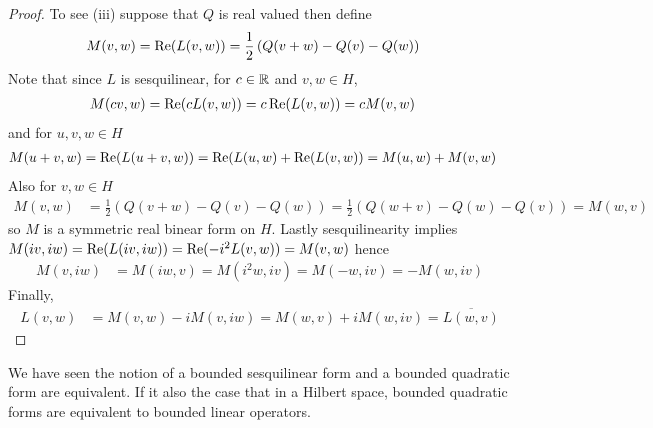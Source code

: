 \begin{proof}
To see (iii) suppose that $Q$ is real valued then define
\begin{align*}
M(v,w) &= \operatorname*{Re} (L(v,w))  = \frac{1}{2} \left( Q(v+w) - Q(v) - Q(w) \right)
\end{align*}
Note that since $L$ is sesquilinear, for $c \in \mathbb{R}$ and $v,w \in H$,
\begin{align*}
M(cv, w) &= \operatorname*{Re} (c L(v,w)) =c \operatorname*{Re} ( L(v,w)) = cM(v,w)
\end{align*}
and for $u,v,w \in H$
\begin{align*}
M(u+v, w) &= \operatorname*{Re} (L(u+v,w)) =\operatorname*{Re} ( L(u,w) + \operatorname*{Re} ( L(v,w)) = M(u,w) + M(v,w)
\end{align*}
Also for $v,w \in H$
\begin{align*}
M(v,w) &= \frac{1}{2} \left( Q(v+w) - Q(v) - Q(w) \right) = \frac{1}{2} \left( Q(w+v) - Q(w) - Q(v) \right) = M(w,v)
\end{align*}
so $M$ is a symmetric real binear form on $H$.  Lastly sesquilinearity implies $M(iv,iw) = \operatorname*{Re} ( L(iv,iw)) = \operatorname*{Re} (-i^2 L(v,w)) = M(v,w)$ hence 
\begin{align*}
M(v,iw) &= M(iw, v) = M(i^2w, iv) = M(-w, iv) = -M(w,iv)
\end{align*}
Finally,
\begin{align*}
L(v,w) &= M(v,w) - i M(v,iw) = M(w,v) + i M(w, iv) = \overline{L(w, v)}
\end{align*}
\end{proof}

We have seen the notion of a bounded sesquilinear form and a bounded quadratic form are equivalent.  If it also the case that in a Hilbert space, bounded quadratic forms are equivalent to bounded linear operators.


